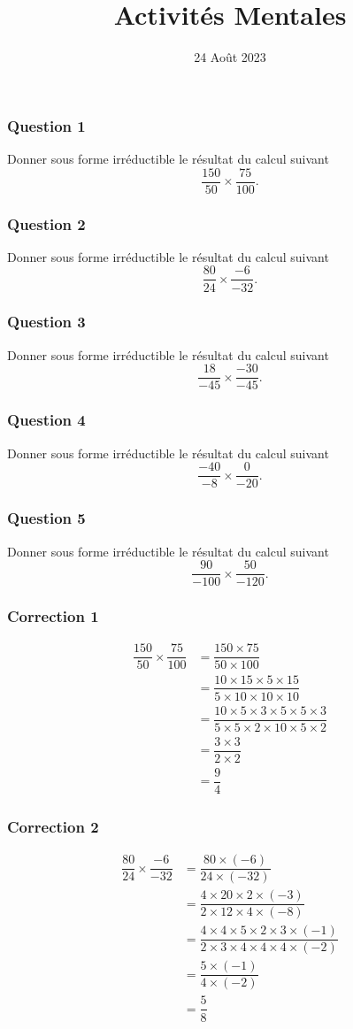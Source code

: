 \documentclass[15pt, mathserif]{beamer}
\title{Activités Mentales}
\date{24 Août 2023}
\begin{document}
\begin{frame}
    \titlepage
\end{frame}

\begin{frame} 
	\frametitle{Question 1}
Donner sous forme irréductible le résultat du calcul suivant \[\dfrac{150}{50} \times \dfrac{75}{100}.\]\end{frame}


\begin{frame} 
	\frametitle{Question 2}
Donner sous forme irréductible le résultat du calcul suivant \[\dfrac{80}{24} \times \dfrac{-6}{-32}.\]\end{frame}


\begin{frame} 
	\frametitle{Question 3}
Donner sous forme irréductible le résultat du calcul suivant \[\dfrac{18}{-45} \times \dfrac{-30}{-45}.\]\end{frame}


\begin{frame} 
	\frametitle{Question 4}
Donner sous forme irréductible le résultat du calcul suivant \[\dfrac{-40}{-8} \times \dfrac{0}{-20}.\]\end{frame}


\begin{frame} 
	\frametitle{Question 5}
Donner sous forme irréductible le résultat du calcul suivant \[\dfrac{90}{-100} \times \dfrac{50}{-120}.\]\end{frame}


\begin{frame}
\vspace{-10mm}
	\frametitle{Correction 1}
	\begin{align*}
	\dfrac{150}{50} \times \dfrac{75}{100}&= \dfrac{150 \times 75}{50 \times 100}\\
		&=\dfrac{10 \times 15 \times 5 \times 15}{5 \times 10 \times 10 \times 10}\\		&=\dfrac{10 \times 5 \times 3 \times 5 \times 5 \times 3}{5 \times 5 \times 2 \times 10 \times 5 \times 2}\\		&=\dfrac{3 \times 3}{2 \times 2}\\		&=\dfrac{9}{4}
	\end{align*}\end{frame}


\begin{frame}
\vspace{-10mm}
	\frametitle{Correction 2}
	\begin{align*}
	\dfrac{80}{24} \times \dfrac{-6}{-32}&= \dfrac{80 \times \left(-6\right)}{24 \times \left(-32\right)}\\
		&=\dfrac{4 \times 20 \times 2 \times \left(-3\right)}{2 \times 12 \times 4 \times \left(-8\right)}\\		&=\dfrac{4 \times 4 \times 5 \times 2 \times 3 \times \left(-1\right)}{2 \times 3 \times 4 \times 4 \times 4 \times \left(-2\right)}\\		&=\dfrac{5 \times \left(-1\right)}{4 \times \left(-2\right)}\\		&=\dfrac{5}{8}
	\end{align*}\end{frame}
\end{document}
